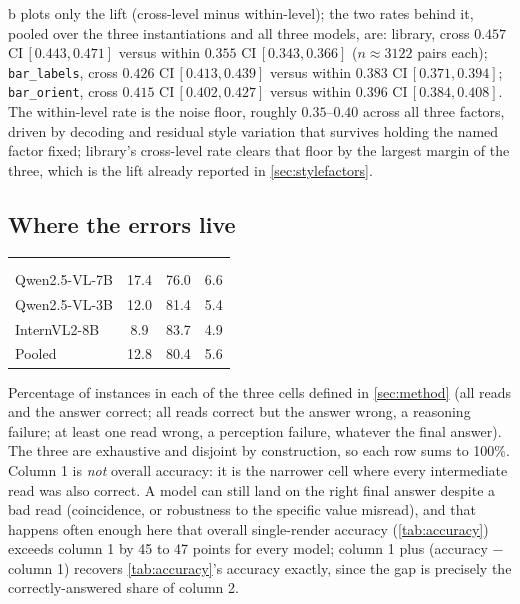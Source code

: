 \documentclass[11pt]{article}
\begin{document}
\noindent {}b plots only the lift (cross-level minus within-level); the two rates behind it, pooled over the three instantiations and all three models, are: library, cross $0.457$ CI\,$[0.443,0.471]$ versus within $0.355$ CI\,$[0.343,0.366]$ ($n{\approx}3122$ pairs each); \texttt{bar\_labels}, cross $0.426$ CI\,$[0.413,0.439]$ versus within $0.383$ CI\,$[0.371,0.394]$; \texttt{bar\_orient}, cross $0.415$ CI\,$[0.402,0.427]$ versus within $0.396$ CI\,$[0.384,0.408]$. The within-level rate is the noise floor, roughly $0.35$--$0.40$ across all three factors, driven by decoding and residual style variation that survives holding the named factor fixed; library's cross-level rate clears that floor by the largest margin of the three, which is the lift already reported in \cref{sec:stylefactors}.

\subsection{Where the errors live}
\label{sec:errors}

\begin{center}
\footnotesize
\setlength{\tabcolsep}{3pt}
\begin{tabular}{@{}l S[table-format=2.1] S[table-format=2.1] S[table-format=2.1]@{}}
\toprule
      & {} & {} & {} \\
 & {} & {}       & {} \\
\midrule
Qwen2.5-VL-7B & 17.4 & 76.0 & 6.6 \\
Qwen2.5-VL-3B & 12.0 & 81.4 & 5.4 \\
InternVL2-8B  &  8.9 & 83.7 & 4.9 \\
\midrule
Pooled        & 12.8 & 80.4 & 5.6 \\
\bottomrule
\end{tabular}
\end{center}

\noindent Percentage of instances in each of the three cells defined in \cref{sec:method} (all reads and the answer correct; all reads correct but the answer wrong, a reasoning failure; at least one read wrong, a perception failure, whatever the final answer). The three are exhaustive and disjoint by construction, so each row sums to 100\%. Column 1 is \emph{not} overall accuracy: it is the narrower cell where every intermediate read was also correct. A model can still land on the right final answer despite a bad read (coincidence, or robustness to the specific value misread), and that happens often enough here that overall single-render accuracy (\cref{tab:accuracy}) exceeds column 1 by 45 to 47 points for every model; column 1 plus (accuracy $-$ column 1) recovers \cref{tab:accuracy}'s accuracy exactly, since the gap is precisely the correctly-answered share of column 2.
\end{document}
